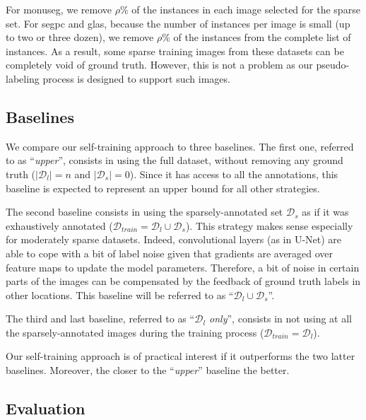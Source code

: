For \acrshort{monuseg}, we remove $\rho \%$ of the instances in each image selected for the sparse set. For \acrshort{segpc} and \acrshort{glas}, because the number of instances per image is small (up to two or three dozen), we remove $\rho \%$ of the instances from the complete list of instances. As a result, some sparse training images from these  datasets can be completely void of ground truth. However, this is not a problem as our pseudo-labeling process is designed to support such images. 

\subsection{Baselines}
\label{ssec:strain:baselines}

We compare our self-training approach to three baselines. The first one, referred to as ``\textit{upper}'', consists in using the full dataset, without removing any ground truth (\ie $|\mathcal{D}_l| = n$ and $|\mathcal{D}_s| = 0$). Since it has access to all the annotations, this baseline is expected to represent an upper bound for all other strategies. 

The second baseline consists in using the sparsely-annotated set $\mathcal{D}_s$ as if it was exhaustively annotated ($\mathcal{D}_{train} = \mathcal{D}_l \cup \mathcal{D}_s$). This strategy makes sense especially for moderately sparse datasets. Indeed, convolutional layers (as in U-Net) are able to cope with a bit of label noise given that gradients are averaged over feature maps to update the model parameters. Therefore, a bit of noise in certain parts of the images can be compensated by the feedback of ground truth labels in other locations. This baseline will be referred to as ``$\mathcal{D}_l \cup \mathcal{D}_s$''.

The third and last baseline, referred to as ``\textit{$\mathcal{D}_l$ only}'', consists in not using at all the sparsely-annotated images during the training process (\ie $\mathcal{D}_{train} = \mathcal{D}_l$).

Our self-training approach is of practical interest if it outperforms the two latter baselines. Moreover, the closer to the ``\textit{upper}'' baseline the better.

\subsection{Evaluation}
\label{ssec:strain:evaluation}

